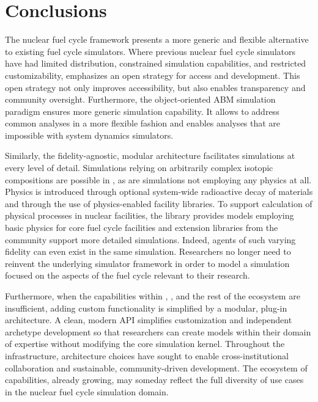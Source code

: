 

\section{Conclusions}


The \Cyclus nuclear fuel cycle framework presents a more generic and flexible
alternative to existing fuel cycle simulators. Where previous nuclear fuel
cycle simulators have had limited distribution, constrained simulation
capabilities, and restricted customizability, \Cyclus emphasizes an open
strategy for access and development.  This open strategy not only improves
accessibility, but also enables transparency and community oversight. 
Furthermore, the object-oriented \gls{ABM} simulation paradigm ensures more generic
simulation capability. It allows \Cyclus to address common analyses in a more
flexible fashion and enables analyses that are impossible with system dynamics
simulators.

Similarly, the fidelity-agnostic, modular \Cyclus architecture facilitates simulations
at every level of detail. Simulations relying on arbitrarily complex isotopic
compositions are possible in \Cyclus, as are simulations not employing any
physics at all. Physics is introduced through optional system-wide radioactive 
decay of materials and through the use of physics-enabled facility libraries.  
To support calculation of physical processes in nuclear facilities, the 
\Cycamore library provides models employing basic physics for core fuel cycle 
facilities and extension libraries from the community support more detailed 
simulations. Indeed, agents of such varying fidelity can even exist in the same 
simulation. Researchers no longer need to reinvent the underlying simulator 
framework in order to model a simulation focused on the aspects of the fuel 
cycle relevant to their research.

Furthermore, when the capabilities within \Cyclus, \Cycamore, and the rest of
the ecosystem are insufficient, adding custom functionality is simplified by a
modular, plug-in architecture. A clean, modern \gls{API} simplifies
customization and independent archetype development so that researchers can
create models within their domain of expertise without modifying the core
simulation kernel. Throughout the \Cyclus
infrastructure, architecture choices have sought to enable cross-institutional
collaboration and sustainable, community-driven development. The ecosystem
of capabilities, already growing, may someday reflect the full diversity of use
cases in the nuclear fuel cycle simulation domain.


